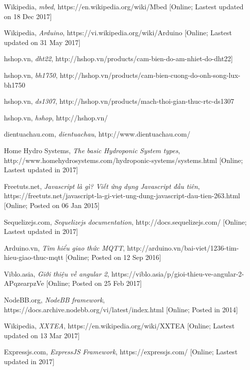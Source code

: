 \documentclass[a4paper,12pt,oneside]{article}
\begin{document}
\begin{thebibliography}{80}
 Wikipedia, 
\textit{mbed}, https://en.wikipedia.org/wiki/Mbed [Online; Lastest updated on 18 Dec 2017] %

 Wikipedia, 
\textit{Arduino}, https://vi.wikipedia.org/wiki/Arduino [Online; Lastest updated on 31 May 2017] %

 hshop.vn, 
\textit{dht22}, http://hshop.vn/products/cam-bien-do-am-nhiet-do-dht22] %

 hshop.vn, 
\textit{bh1750}, http://hshop.vn/products/cam-bien-cuong-do-onh-song-lux-bh1750 %

 hshop.vn, 
\textit{ds1307}, http://hshop.vn/products/mach-thoi-gian-thuc-rtc-ds1307 %

 hshop.vn,
\textit{hshop}, http://hshop.vn/

 dientuachau.com,
\textit{dientuachau}, http://www.dientuachau.com/

 Home Hydro Systems, 
\textit{The basic Hydroponic System types}, http://www.homehydrosystems.com/hydroponic-systems/systems.html [Online; Lastest updated in 2017]

 Freetuts.net,
\textit{Javascript là gì? Viết ứng dụng Javascript đầu tiên}, https://freetuts.net/javascript-la-gi-viet-ung-dung-javascript-dau-tien-263.html [Online; Posted on 06 Jan 2015]

 Sequelizejs.com, 
\textit{Sequelizejs documentation}, http://docs.sequelizejs.com/ [Online; Lastest updated in 2017]


 Arduino.vn, 
\textit{Tìm hiểu giao thức MQTT}, http://arduino.vn/bai-viet/1236-tim-hieu-giao-thuc-mqtt [Online; Posted on 12 Sep 2016]

 Viblo.asia, 
\textit{Giới thiệu về angular 2}, https://viblo.asia/p/gioi-thieu-ve-angular-2-APqzearpzVe [Online; Posted on 25 Feb 2017]

 NodeBB.org, 
\textit{NodeBB framework}, https://docs.archive.nodebb.org/vi/latest/index.html [Online; Posted in 2014]

 Wikipedia, 
\textit{XXTEA}, https://en.wikipedia.org/wiki/XXTEA [Online; Lastest updated on 13 Mar 2017]

 Expressjs.com, 
\textit{ExpressJS Framework}, https://expressjs.com/ [Online; Lastest updated in 2017]


\end{thebibliography}
\end{document}
